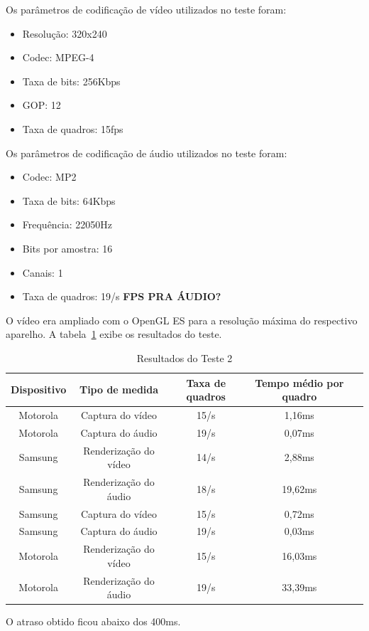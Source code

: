 \documentclass{acm_proc_article-sp}
\newcommand{\todo}[1]{\textcolor[rgb]{1.00,0.00,0.00}{\bf \uppercase{#1}}}
\begin{document}
Os parâmetros de codificação de vídeo utilizados no teste foram:
\begin{itemize}
 \item Resolução: 320x240
 \item Codec: MPEG-4
 \item Taxa de bits: 256Kbps
 \item GOP: 12
 \item Taxa de quadros: 15fps
\end{itemize}
Os parâmetros de codificação de áudio utilizados no teste foram:
\begin{itemize}
 \item Codec: MP2
 \item Taxa de bits: 64Kbps
 \item Frequência: 22050Hz
 \item Bits por amostra: 16
 \item Canais: 1
 \item Taxa de quadros: 19/s \todo{fps pra áudio?}
\end{itemize}
O vídeo era ampliado com o OpenGL ES para a resolução máxima do respectivo aparelho. A tabela~\ref{tabela_teste2} exibe os resultados do teste.
\begin{table}
\centering
\caption{Resultados do Teste 2}
\label{tabela_teste2}
\begin{tabular}{|c|c|c|c|l} \hline
Dispositivo&Tipo de medida&Taxa de quadros&Tempo médio por quadro\\ \hline
Motorola&Captura do vídeo&15/s&1,16ms\\ \hline
Motorola&Captura do áudio&19/s&0,07ms\\ \hline
Samsung&Renderização do vídeo&14/s&2,88ms\\ \hline
Samsung&Renderização do áudio&18/s&19,62ms\\ \hline
Samsung&Captura do vídeo&15/s&0,72ms\\ \hline
Samsung&Captura do áudio&19/s&0,03ms\\ \hline
Motorola&Renderização do vídeo&15/s&16,03ms\\ \hline
Motorola&Renderização do áudio&19/s&33,39ms\\
\hline\end{tabular}
\end{table}
O atraso obtido ficou abaixo dos 400ms.
\end{document}

